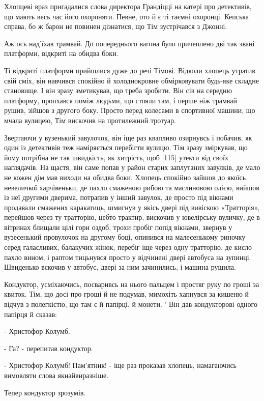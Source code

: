 Хлопцеві враз пригадалися слова директора Грандіцці на катері про детективів, що мають весь час його охороняти. Певне, ото й є ті таємні охоронці. Кепська справа, бо ж барон не повинен дізнатися, що Тім зустрічався з Джонні.

Аж ось над'їхав трамвай. До попереднього вагона було причеплено дві так звані платформи, відкриті на обидва боки.

Ті відкриті платформи прийшлися дуже до речі Тімові. Відколи хлопець утратив свій сміх, він навчився спокійно й холоднокровне обмірковувати будь-яке складне становище. І він зразу зметикував, що треба зробити. Він сів на середню платформу, пропхався поміж людьми, що стояли там, і перше ніж трамвай рушив, зійшов з другого боку. Просто перед колесами в спортивної машини, що мчала вулицею, Тім вискочив на протилежний тротуар.

Звертаючи у вузенький завулочок, він іще раз квапливо озирнувсь і побачив, як один із детективів теж наміряється перебігти вулицю. Тім зразу зміркував, що йому потрібна не так швидкість, як хитрість, щоб [115] утекти від своїх наглядачів. На щастя, він саме попав у район старих заплутаних завулків, де мало не кожен дім мав виходи на обидва боки. Хлопець спокійно зайшов до якоїсь невеличкої харчівеньки, де пахло смаженою рибою та маслиновою олією, вийшов із неї другими дверима, потрапив у інший завулок, де просто під вікнами продавали смажених каракатиць, шмигнув у якісь двері під вивіскою «Тратторія», перейшов через ту тратторію, цебто трактир, вискочив у ювелірську вуличку, де в вітринах блищали цілі гори оздоб, трохи пробіг попід вікнами, звернув у вузесенький провулочок на другому боці, опинився на малесенькому риночку серед галасливих, балакучих жінок, перебіг іще через одну тратторію, де кисло пахло вином, і раптом тицьнувся просто у відчинені двері автобуса на зупинці. Швиденько вскочив у автобус, двері за ним зачинились, і машина рушила.

Кондуктор, усміхаючись, посваривсь на нього пальцем і простяг руку по гроші за квиток. Тім, що досі про гроші й не подумав, мимохіть хапнувся за кишеню й відчув з полегкістю, що там є й папірці, й монети. ' Він дав кондукторові одного папірця й сказав:

- Христофор Колумб.

- Га? - перепитав кондуктор.

- Христофор Колумб! Пам'ятник! - іще раз проказав хлопець, намагаючись вимовляти слова якнайвиразніше.

Тепер кондуктор зрозумів.

